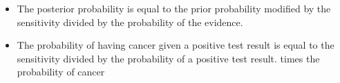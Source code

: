 \documentclass[12pt,a4paper]{report}
\begin{document}
\begin{enumerate}
\begin{itemize}
		\item The posterior probability is equal to the prior probability modified by the sensitivity divided by the probability of the evidence.

		\item The probability of having cancer given a positive test result is equal to the sensitivity divided by the probability of a positive test result. times the probability of cancer
	\end{itemize}

\end{enumerate}
\end{document}
